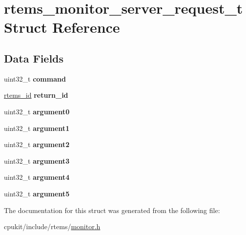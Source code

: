 \hypertarget{structrtems__monitor__server__request__t}{}\section{rtems\+\_\+monitor\+\_\+server\+\_\+request\+\_\+t Struct Reference}
\label{structrtems__monitor__server__request__t}
\subsection*{Data Fields}
\begin{DoxyCompactItemize}
\item 
\mbox{\label{structrtems__monitor__server__request__t_a38c6c7cf82386bcc277c28b9e26110ac}} 
uint32\+\_\+t {\bfseries command}
\item 
\mbox{\label{structrtems__monitor__server__request__t_a1e6aae99373634ac38a68717bb81b441}} 
\mbox{\hyperlink{group__ClassicTasks_gab20892b814dced7dd4e5b9bf42becd57}{rtems\+\_\+id}} {\bfseries return\+\_\+id}
\item 
\mbox{\label{structrtems__monitor__server__request__t_a1292e6bf69ad7e6451087dfcf2f42a63}} 
uint32\+\_\+t {\bfseries argument0}
\item 
\mbox{\label{structrtems__monitor__server__request__t_ae702527bc223d1f44868ac94ebe12a80}} 
uint32\+\_\+t {\bfseries argument1}
\item 
\mbox{\label{structrtems__monitor__server__request__t_a87ef54e747ba67e122345c8628b7036a}} 
uint32\+\_\+t {\bfseries argument2}
\item 
\mbox{\label{structrtems__monitor__server__request__t_ab14f243e8be354899dc2e9af2cfddbd0}} 
uint32\+\_\+t {\bfseries argument3}
\item 
\mbox{\label{structrtems__monitor__server__request__t_a4bd39203383b5eb99a97f49275d8ebfd}} 
uint32\+\_\+t {\bfseries argument4}
\item 
\mbox{\label{structrtems__monitor__server__request__t_ae7f281b4dc5efc8639e49ee67a073611}} 
uint32\+\_\+t {\bfseries argument5}
\end{DoxyCompactItemize}


The documentation for this struct was generated from the following file\+:\begin{DoxyCompactItemize}
\item 
cpukit/include/rtems/\mbox{\hyperlink{monitor_8h}{monitor.\+h}}\end{DoxyCompactItemize}

